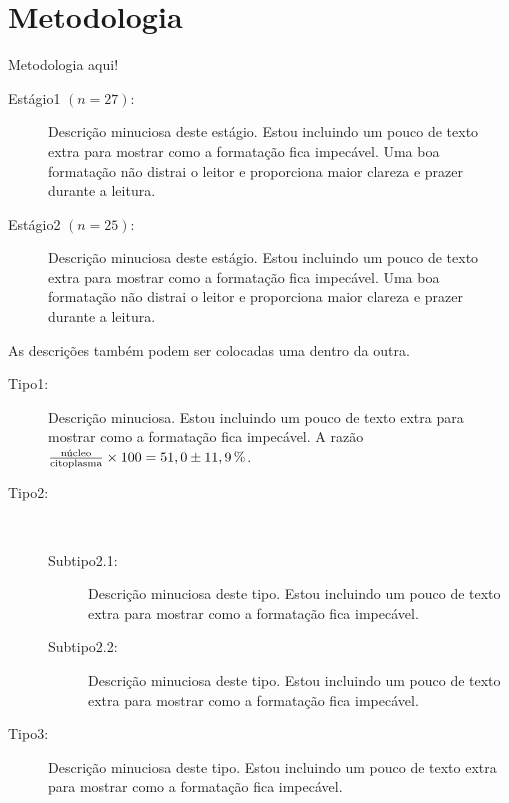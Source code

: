 \pagestyle{fancy}

\chapter{Metodologia}\label{cap4}

Metodologia aqui!

\begin{description}
  \item[Estágio1 $(n=27)$:] Descrição minuciosa deste estágio.
    Estou incluindo um pouco de texto extra para mostrar como a formatação fica impecável.
    Uma boa formatação não distrai o leitor e proporciona maior clareza e prazer durante a leitura.
  \item[Estágio2 $(n=25)$:] Descrição minuciosa deste estágio.
    Estou incluindo um pouco de texto extra para mostrar como a formatação fica impecável.
    Uma boa formatação não distrai o leitor e proporciona maior clareza e prazer durante a leitura.
\end{description}

As descrições também podem ser colocadas uma dentro da outra.

\begin{description}
  \item[Tipo1:] Descrição minuciosa.
    Estou incluindo um pouco de texto extra para mostrar como a formatação fica impecável.
    A razão $\frac{\text{núcleo}}{\text{citoplasma}}\times100=51,0\pm\unit[11,9]{\%}$.
  \item[Tipo2:] ~
    \begin{description}
      \item[Subtipo2.1:] Descrição minuciosa deste tipo.
	Estou incluindo um pouco de texto extra para mostrar como a formatação fica impecável.
      \item[Subtipo2.2:] Descrição minuciosa deste tipo.
	Estou incluindo um pouco de texto extra para mostrar como a formatação fica impecável.
    \end{description}
  \item[Tipo3:] Descrição minuciosa deste tipo.
	Estou incluindo um pouco de texto extra para mostrar como a formatação fica impecável.
\end{description}
